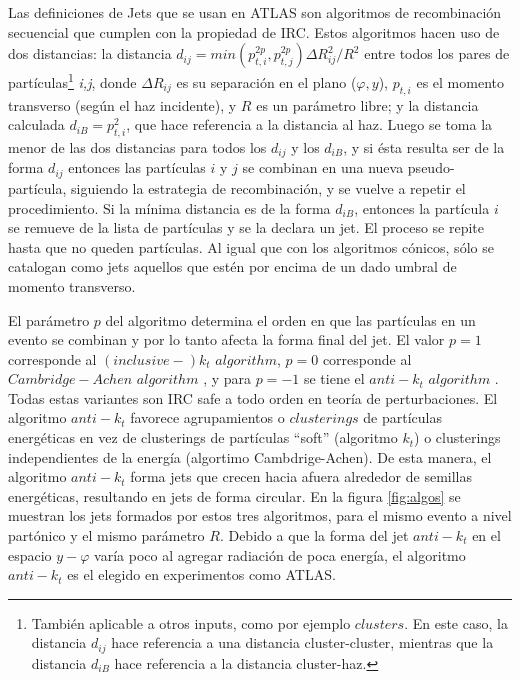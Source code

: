 Las definiciones de Jets que se usan en ATLAS son algoritmos de recombinación secuencial que cumplen con la propiedad de IRC. Estos algoritmos hacen uso de dos distancias: la distancia $d_{ij} = min(p_{t,i}^{2p},p_{t,j}^{2p}) \Delta R_{ij}^2 / R^2$ entre todos los pares de partículas\footnote{También aplicable a otros inputs, como por ejemplo $clusters$. En este caso, la distancia $d_{ij}$ hace referencia a una distancia cluster-cluster, mientras que la distancia $d_{iB}$ hace referencia a la distancia cluster-haz.} \emph{i,j}, donde $ \Delta R_{ij}$ es su separación en el plano ($\varphi, y$), $p_{t,i}$ es el momento transverso (según el haz incidente), y $R$ es un parámetro libre; y la distancia calculada $d_{iB}=p_{t,i}^2$, que hace referencia a la distancia al haz. Luego se toma la menor de las dos distancias para todos los $d_{ij}$ y los $d_{iB}$, y si ésta resulta ser de la forma $d_{ij}$ entonces las partículas $i$ y $j$ se combinan en una nueva pseudo-partícula, siguiendo la estrategia de recombinación, y se vuelve a repetir el procedimiento. Si la mínima distancia es de la forma $d_{iB}$, entonces la partícula $i$ se remueve de la lista de partículas y se la declara un jet. El proceso se repite hasta que no queden partículas. Al igual que con los algoritmos cónicos, sólo se catalogan como jets aquellos que estén por encima de un dado umbral de momento transverso\cite{ParticleDataGroup}. 

El parámetro $p$ del algoritmo determina el orden en que las partículas en un evento se combinan y por lo tanto afecta la forma final del jet. El valor $p=1$ corresponde al $(inclusive-)k_t$ $algorithm$, $p=0$ corresponde al $Cambridge-Achen$ $algorithm$ , y para $p=-1$ se tiene el $anti-k_t$ $algorithm$ \cite{Jetography}\cite{antiKtalgo}. Todas estas variantes son IRC safe a todo orden en teoría de perturbaciones. El algoritmo $anti-k_t$ favorece agrupamientos o $clusterings$ de partículas energéticas en vez de clusterings de partículas ``soft'' (algoritmo $k_t$) o clusterings independientes de la energía (algortimo Cambdrige-Achen). De esta manera, el algoritmo $anti-k_t$ forma jets que crecen hacia afuera alrededor de semillas energéticas, resultando en jets de forma circular. En la figura \ref{fig:algos} se muestran los jets formados por estos tres algoritmos, para el mismo evento a nivel partónico y el mismo parámetro $R$. Debido a que la forma del jet $anti-k_t$ en el espacio $y-\varphi$ varía poco al agregar radiación de poca energía, el algoritmo $anti-k_t$ es el elegido en experimentos como ATLAS.


